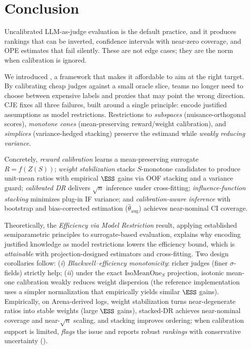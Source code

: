 \section{Conclusion}
\label{sec:conclusion}

Uncalibrated LLM-as-judge evaluation is the default practice, and it produces rankings that can be inverted, confidence intervals with near-zero coverage, and OPE estimates that fail silently. These are not edge cases; they are the norm when calibration is ignored.

We introduced \textbf{\CJE}, a framework that makes it affordable to aim at the right target. By calibrating cheap judges against a small oracle slice, teams no longer need to choose between expensive labels and proxies that may point the wrong direction. CJE fixes all three failures, built around a single principle: encode justified assumptions as model restrictions. Restrictions to \emph{subspaces} (nuisance-orthogonal scores), \emph{monotone cones} (mean-preserving reward/weight calibration), and \emph{simplices} (variance-hedged stacking) preserve the estimand while \emph{weakly reducing variance}.

Concretely, \emph{reward calibration} learns a mean-preserving surrogate $R=f(Z(S))$; \emph{weight stabilization} stacks $S$-monotone candidates to produce unit-mean ratios with empirical $\ESS$ gains via OOF stacking and a variance guard; \emph{calibrated DR} delivers $\sqrt{n}$ inference under cross-fitting; \emph{influence-function stacking} minimizes plug-in IF variance; and \emph{calibration-aware inference} with bootstrap and bias-corrected estimation ($\hat\theta_{\mathrm{aug}}$) achieves near-nominal CI coverage.

Theoretically, the \emph{Efficiency via Model Restriction} result, applying established semiparametric principles to surrogate-based evaluation, explains why encoding justified knowledge as model restrictions lowers the efficiency bound, which is \emph{attainable} with projection-designed estimators and cross-fitting. Two design corollaries follow: (\emph{i}) \emph{Blackwell–efficiency monotonicity}: richer judges (finer $\sigma$-fields) strictly help; (\emph{ii}) under the exact $\mathrm{IsoMeanOne}_S$ projection, isotonic mean-one calibration weakly reduces weight dispersion (the reference implementation uses a simpler normalization that empirically yields similar $\ESS$ gains). Empirically, on Arena-derived logs, weight stabilization turns near-degenerate ratios into stable weights (large $\ESS$ gains), stacked-DR achieves near-nominal coverage and near-$\sqrt{n}$ scaling, and stacking improves ordering; when calibration support is limited, \CJE{} \emph{flags} the issue and reports robust \emph{rankings} with conservative uncertainty (\RefuseLevel).

